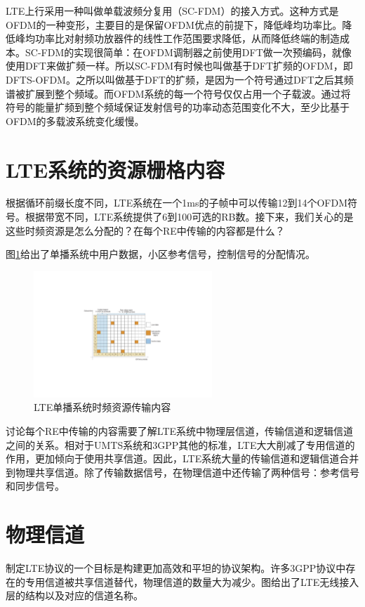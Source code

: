 \documentclass[10pt,a4paper,UTF8]{article}
\begin{document}
LTE上行采用一种叫做单载波频分复用（SC-FDM）的接入方式。这种方式是OFDM的一种变形，主要目的是保留OFDM优点的前提下，降低峰均功率比。降低峰均功率比对射频功放器件的线性工作范围要求降低，从而降低终端的制造成本。SC-FDM的实现很简单：在OFDM调制器之前使用DFT做一次预编码，就像使用DFT来做扩频一样。所以SC-FDM有时候也叫做基于DFT扩频的OFDM，即DFTS-OFDM。之所以叫做基于DFT的扩频，是因为一个符号通过DFT之后其频谱被扩展到整个频域。而OFDM系统的每一个符号仅仅占用一个子载波。通过将符号的能量扩频到整个频域保证发射信号的功率动态范围变化不大，至少比基于OFDM的多载波系统变化缓慢。
\section{LTE系统的资源栅格内容}
\label{sec:orgheadline15}


根据循环前缀长度不同，LTE系统在一个1ms的子帧中可以传输12到14个OFDM符号。根据带宽不同，LTE系统提供了6到100可选的RB数。接下来，我们关心的是这些时频资源是怎么分配的？在每个RE中传输的内容都是什么？

图\ref{fig:orgparagraph4}给出了单播系统中用户数据，小区参考信号，控制信号的分配情况。
\begin{figure}[htb]
\centering
\includegraphics[width=0.6\textwidth]{../../img/20151101lteunicast.pdf}
\caption{\label{fig:orgparagraph4}
LTE单播系统时频资源传输内容}
\end{figure}

讨论每个RE中传输的内容需要了解LTE系统中物理层信道，传输信道和逻辑信道之间的关系。相对于UMTS系统和3GPP其他的标准，LTE大大削减了专用信道的作用，更加倾向于使用共享信道。因此，LTE系统大量的传输信道和逻辑信道合并到物理共享信道。除了传输数据信号，在物理信道中还传输了两种信号：参考信号和同步信号。

\section{物理信道}
\label{sec:orgheadline20}


制定LTE协议的一个目标是构建更加高效和平坦的协议架构。许多3GPP协议中存在的专用信道被共享信道替代，物理信道的数量大为减少。图给出了LTE无线接入层的结构以及对应的信道名称。
\end{document}
